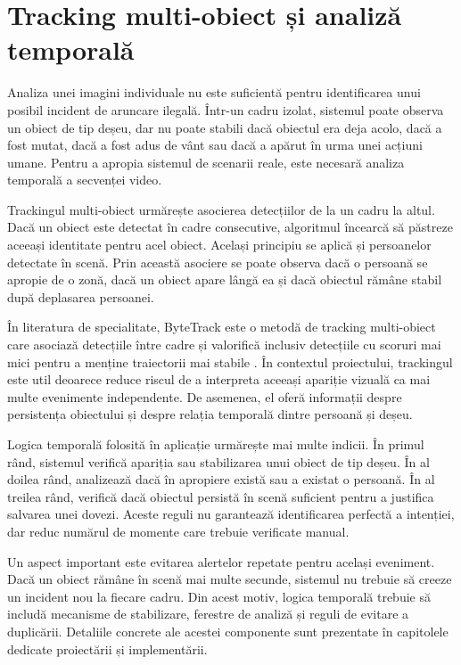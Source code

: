\section{Tracking multi-obiect și analiză temporală}

Analiza unei imagini individuale nu este suficientă pentru identificarea unui posibil incident de aruncare ilegală. Într-un cadru izolat, sistemul poate observa un obiect de tip deșeu, dar nu poate stabili dacă obiectul era deja acolo, dacă a fost mutat, dacă a fost adus de vânt sau dacă a apărut în urma unei acțiuni umane. Pentru a apropia sistemul de scenarii reale, este necesară analiza temporală a secvenței video.

Trackingul multi-obiect urmărește asocierea detecțiilor de la un cadru la altul. Dacă un obiect este detectat în cadre consecutive, algoritmul încearcă să păstreze aceeași identitate pentru acel obiect. Același principiu se aplică și persoanelor detectate în scenă. Prin această asociere se poate observa dacă o persoană se apropie de o zonă, dacă un obiect apare lângă ea și dacă obiectul rămâne stabil după deplasarea persoanei.

În literatura de specialitate, ByteTrack este o metodă de tracking multi-obiect care asociază detecțiile între cadre și valorifică inclusiv detecțiile cu scoruri mai mici pentru a menține traiectorii mai stabile \cite{zhang2022bytetrack}. În contextul proiectului, trackingul este util deoarece reduce riscul de a interpreta aceeași apariție vizuală ca mai multe evenimente independente. De asemenea, el oferă informații despre persistența obiectului și despre relația temporală dintre persoană și deșeu.

Logica temporală folosită în aplicație urmărește mai multe indicii. În primul rând, sistemul verifică apariția sau stabilizarea unui obiect de tip deșeu. În al doilea rând, analizează dacă în apropiere există sau a existat o persoană. În al treilea rând, verifică dacă obiectul persistă în scenă suficient pentru a justifica salvarea unei dovezi. Aceste reguli nu garantează identificarea perfectă a intenției, dar reduc numărul de momente care trebuie verificate manual.

Un aspect important este evitarea alertelor repetate pentru același eveniment. Dacă un obiect rămâne în scenă mai multe secunde, sistemul nu trebuie să creeze un incident nou la fiecare cadru. Din acest motiv, logica temporală trebuie să includă mecanisme de stabilizare, ferestre de analiză și reguli de evitare a duplicării. Detaliile concrete ale acestei componente sunt prezentate în capitolele dedicate proiectării și implementării.

